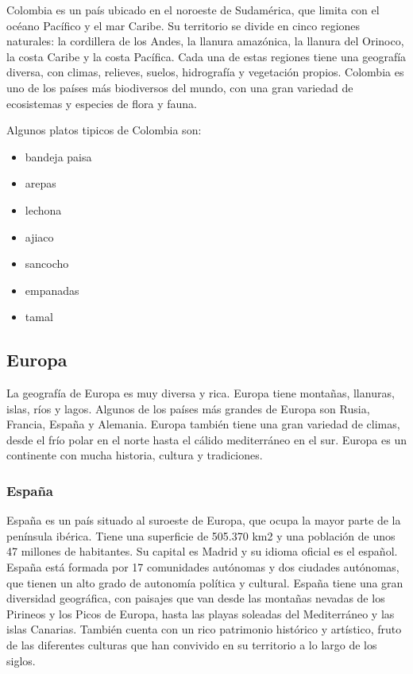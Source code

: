 \documentclass{article}
\begin{document}
Colombia es un país ubicado en el noroeste de Sudamérica, que limita con el océano Pacífico y el mar Caribe. Su territorio se divide en cinco regiones naturales: la cordillera de los Andes, la llanura amazónica, la llanura del Orinoco, la costa Caribe y la costa Pacífica. Cada una de estas regiones tiene una geografía diversa, con climas, relieves, suelos, hidrografía y vegetación propios. Colombia es uno de los países más biodiversos del mundo, con una gran variedad de ecosistemas y especies de flora y fauna.
 

Algunos platos tipicos de Colombia son:
\begin{itemize}
    \item bandeja paisa
    \item arepas 
    \item lechona
    \item ajiaco
    \item sancocho
    \item empanadas
    \item tamal
\end{itemize}
\subsection{Europa}

La geografía de Europa es muy diversa y rica. Europa tiene montañas, llanuras, islas, ríos y lagos. Algunos de los países más grandes de Europa son Rusia, Francia, España y Alemania. Europa también tiene una gran variedad de climas, desde el frío polar en el norte hasta el cálido mediterráneo en el sur. Europa es un continente con mucha historia, cultura y tradiciones.

\subsubsection{España}
España es un país situado al suroeste de Europa, que ocupa la mayor parte de la península ibérica. Tiene una superficie de 505.370 km2 y una población de unos 47 millones de habitantes. Su capital es Madrid y su idioma oficial es el español. España está formada por 17 comunidades autónomas y dos ciudades autónomas, que tienen un alto grado de autonomía política y cultural. España tiene una gran diversidad geográfica, con paisajes que van desde las montañas nevadas de los Pirineos y los Picos de Europa, hasta las playas soleadas del Mediterráneo y las islas Canarias. También cuenta con un rico patrimonio histórico y artístico, fruto de las diferentes culturas que han convivido en su territorio a lo largo de los siglos.
\end{document}

